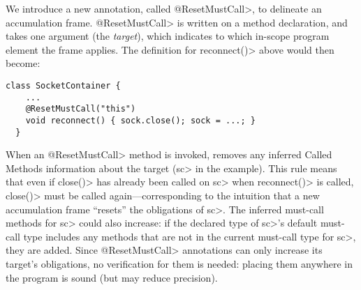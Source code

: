 We introduce a new annotation, called \<@ResetMustCall>, to delineate
an accumulation frame. \<@ResetMustCall> is written on a method
declaration, and takes one argument (the \emph{target}), which
indicates to which in-scope program element the frame applies. The
definition for \<reconnect()> above would then become:

\begin{lstlisting}[frame=tb,belowskip=3mm]
  class SocketContainer {
    ...
    @ResetMustCall("this")
    void reconnect() { sock.close(); sock = ...; }
  }
\end{lstlisting}

When an \<@ResetMustCall>
method is invoked, \tool removes any
inferred Called Methods information about the target (\<sc> in the example).
This rule means that even if \<close()> has already been called on \<sc>
when \<reconnect()>
is called, \<close()> must be called again---corresponding to the intuition
that a new accumulation frame ``resets'' the obligations of \<sc>.
The inferred must-call methods for \<sc> could also increase:
if the declared type of \<sc>'s default must-call type includes any
methods that are not in the current must-call type for \<sc>, they are added.
Since \<@ResetMustCall> annotations can only increase its target's obligations,
no verification for them is needed: placing them anywhere in the program is sound
(but may reduce precision).

